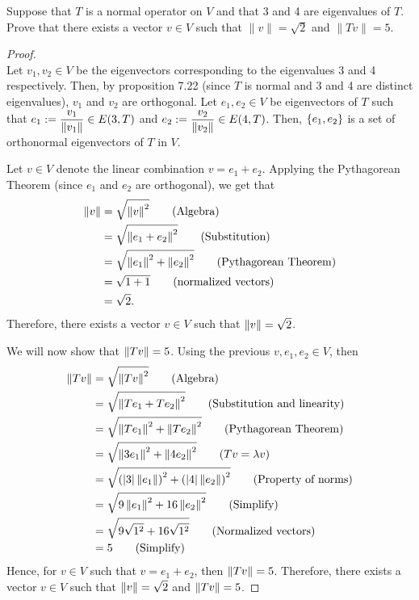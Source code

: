 Suppose that $T$ is a normal operator on $V$ and that 3 and 4 are eigenvalues of $T$.  Prove that there exists a vector $v \in V$ such that $\|v\| = \sqrt{2}$ and $\|Tv\| = 5$. 
\begin{proof} \,\\
Let $v_1, v_2 \in V$ be the eigenvectors corresponding to the eigenvalues 3 and 4 respectively. Then, by proposition 7.22 (since $T$ is normal and 3 and 4 are distinct eigenvalues), $v_1$ and $v_2$ are orthogonal. Let $e_1, e_2 \in V$ be eigenvectors of $T$ such that $e_1 := \dfrac{v_1}{\left\| {v_1} \right\|} \in E(3, T)$ and $e_2 := \dfrac{v_2}{\left\| {v_2} \right\|} \in E(4, T)$. Then, $\left\{{e_1, e_2}\right\}$ is a set of orthonormal eigenvectors of $T$ in $V$.

\nl Let $v \in V$ denote the linear combination $v = e_1 + e_2$. Applying the Pythagorean Theorem (since $e_1$ and $e_2$ are orthogonal), we get that
\begin{align*}
    \left\| {v} \right\| &= \sqrt{\left\| {v} \right\|^2} \tag{Algebra}\\
        &= \sqrt{\left\| {e_1 + e_2} \right\|^2} \tag{Substitution}\\
        &= \sqrt{\left\| {e_1} \right\|^2 + \left\| {e_2} \right\|^2} \tag{Pythagorean Theorem}\\
        &= \sqrt{1 + 1} \tag{normalized vectors}\\
        &= \sqrt{2}.
\end{align*}
Therefore, there exists a vector $v \in V$ such that $\left\| {v} \right\| = \sqrt{2}$.

\nl We will now show that $\left\| {Tv} \right\| = 5$. Using the previous $v, e_1, e_2 \in V$, then
\begin{align*}
    \left\| {Tv} \right\| &= \sqrt{\left\| {Tv} \right\|^2} \tag{Algebra}\\
    &= \sqrt{\left\| {Te_1 + Te_2} \right\|^2} \tag{Substitution and linearity}\\
    &= \sqrt{\left\| {Te_1} \right\|^2 + \left\| {Te_2} \right\|^2} \tag{Pythagorean Theorem}\\
    &= \sqrt{ \left\| {3 e_1} \right\|^2 + \left\| {4 e_2} \right\|^2} \tag{$Tv = \lambda v$}\\
    &= \sqrt{ \left( {\left| {3} \right| \left\| {e_1} \right\|} \right)^2 + \left( {\left| {4} \right| \left\| {e_2} \right\|} \right)^2 } \tag{Property of norms}\\
    &= \sqrt{ 9 \left\| {e_1} \right\|^2 + 16 \left\| {e_2} \right\|^2} \tag{Simplify}\\
    &= \sqrt{ 9 \sqrt{1^2} + 16 \sqrt{1^2}} \tag{Normalized vectors}\\
    &= 5\tag{Simplify} \\
\end{align*}
Hence, for $v \in V$ such that $v = e_1+e_2$, then $\left\| {Tv} \right\| = 5$. Therefore, there exists a vector $v \in V$ such that $\left\| {v} \right\| = \sqrt2$ and $\left\| {Tv} \right\| = 5$.
\end{proof}